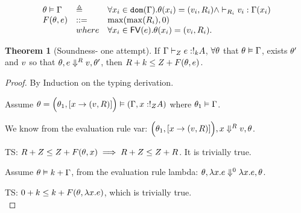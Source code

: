 \documentclass[a4paper,11pt]{article}
\theoremstyle{definition}
\newtheorem{thm}{Theorem}
\begin{document}
\[
  \begin{array}{lll}
     \env \vDash \Gamma &\triangleq  & 
                                        \forall x_i \in \dom( \Gamma) . \env(x_i) =
                                       (\valr_i, \adapt_i) \land
                                       \empty \tvdash{\adapt_i} \valr_i
                                       : \Gamma(x_i)   \\
    F(\env, \expr) & ::= &  \max(\max(\adapt_i) , 0 )    \\
    & where &   \forall x_i \in \fv{\expr} . \env(x_i) = (\valr_i, \adapt_i).
                                          \\
    \end{array}
\]

\begin{thm}[Soundness- one attempt]
\label{soundness}
If $\Gamma \vdash_{Z} e : !_{k} A$, $ \forall \theta$ that $\theta
\vDash \Gamma$, exists $\theta'$ and $v$ so that $\theta , e \mathrel{\Downarrow^{R}} v,
\theta'  $, then  $ R + k \leq  Z + F(\theta, e)$.  
\end{thm}
\begin{proof}
  By Induction on the typing derivation.
  
  Assume $\theta= \Big( \theta_1, [x \to (v,R
  )]  \Big) \vDash (\Gamma , x: !_{Z}A  )$ where $\theta_1
  \vDash \Gamma$.
  
  We know from the evaluation rule var: $\Big( \theta_1, [x \to (v,R
  )]  \Big) , x \mathrel{\Downarrow^{R}} v,
  \theta  $.
  
  TS:  $ R +Z  \leq  Z +
  F(\theta,x) \implies R + Z \leq Z +  R
  $. It is trivially true.\\


Assume $\theta \vDash k+\Gamma $,  from the evaluation rule lambda:
$\theta , \lambda x. e \mathrel{\Downarrow^{0}}   \lambda x. e ,
  \theta  $.

TS: $ 0 + k  \leq  k  +
  F(\theta, \lambda x. e)  
  $, which is trivially true. \\
  

\end{proof}
\end{document}
